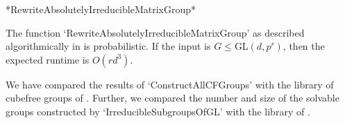 *RewriteAbsolutelyIrreducibleMatrixGroup*

The function `RewriteAbsolutelyIrreducibleMatrixGroup' as described
algorithmically in
\cite{GlHo97} is probabilistic. If the input is $G\leq$GL$(d,p^r)$, then the
expected runtime is $O(rd^3)$.



We have compared the results of `ConstructAllCFGroups' with the library of
cubefree groups of {\GrpConst}. Further, we compared the number and size of the
solvable groups constructed by `IrreducibleSubgroupsOfGL' with the library of {\Irredsol}.




